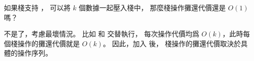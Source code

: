 \startEXERCISE
如果棧支持 ，
可以將 $k$ 個數據一起壓入棧中，
那麼棧操作攤還代價還是 $O(1)$ 嗎？
\stopEXERCISE

\startANSWER
不是了，考慮最壞情況。
比如  和  交替執行，
每次操作代價均爲 $O(k)$，此時每個棧操作的攤還代價就是 $O(k)$。
因此，加入  後，
棧操作的攤還代價取決於具體的操作序列。
\stopANSWER
